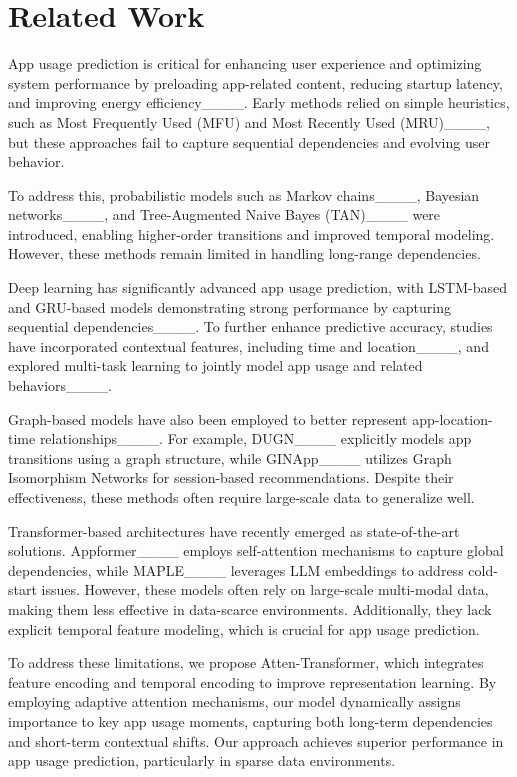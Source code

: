 \section{Related Work}
App usage prediction is critical for enhancing user experience and optimizing system performance by preloading app-related content, reducing startup latency, and improving energy efficiency____. Early methods relied on simple heuristics, such as Most Frequently Used (MFU) and Most Recently Used (MRU)____, but these approaches fail to capture sequential dependencies and evolving user behavior.

To address this, probabilistic models such as Markov chains____, Bayesian networks____, and Tree-Augmented Naive Bayes (TAN)____ were introduced, enabling higher-order transitions and improved temporal modeling. However, these methods remain limited in handling long-range dependencies.

Deep learning has significantly advanced app usage prediction, with LSTM-based and GRU-based models demonstrating strong performance by capturing sequential dependencies____. To further enhance predictive accuracy, studies have incorporated contextual features, including time and location____, and explored multi-task learning to jointly model app usage and related behaviors____.

Graph-based models have also been employed to better represent app-location-time relationships____. For example, DUGN____ explicitly models app transitions using a graph structure, while GINApp____ utilizes Graph Isomorphism Networks for session-based recommendations.  Despite their effectiveness, these methods often require large-scale data to generalize well.

Transformer-based architectures have recently emerged as state-of-the-art solutions. Appformer____ employs self-attention mechanisms to capture global dependencies, while MAPLE____ leverages LLM embeddings to address cold-start issues. However, these models often rely on large-scale multi-modal data, making them less effective in data-scarce environments. Additionally, they lack explicit temporal feature modeling, which is crucial for app usage prediction.

To address these limitations, we propose Atten-Transformer, which integrates feature encoding and temporal encoding to improve representation learning. By employing adaptive attention mechanisms, our model dynamically assigns importance to key app usage moments, capturing both long-term dependencies and short-term contextual shifts. Our approach achieves superior performance in app usage prediction, particularly in sparse data environments.